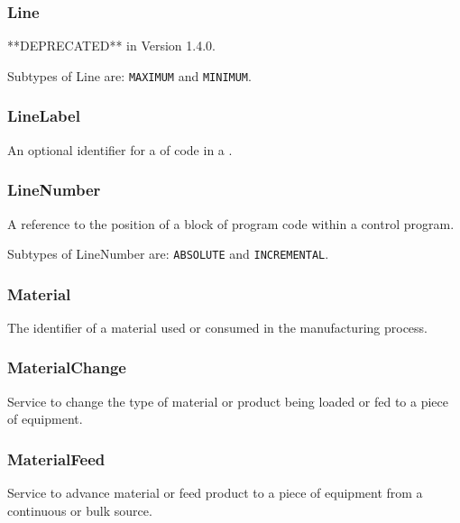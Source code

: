 \subsubsection{Line}
  \label{sec:Line}


**DEPRECATED** in Version 1.4.0.


Subtypes of Line are: \texttt{MAXIMUM} and \texttt{MINIMUM}. 
\FloatBarrier

\subsubsection{LineLabel}
  \label{sec:LineLabel}


An optional identifier for a  of code in a .

\FloatBarrier

\subsubsection{LineNumber}
  \label{sec:LineNumber}


A reference to the position of a block of program code within a control program.


Subtypes of LineNumber are: \texttt{ABSOLUTE} and \texttt{INCREMENTAL}. 
\FloatBarrier

\subsubsection{Material}
  \label{sec:Material}


The identifier of a material used or consumed in the manufacturing process.

\FloatBarrier

\subsubsection{MaterialChange}
  \label{sec:MaterialChange}


Service to change the type of material or product being loaded or fed to a piece of equipment.

\FloatBarrier

\subsubsection{MaterialFeed}
  \label{sec:MaterialFeed}


Service to advance material or feed product to a piece of equipment from a continuous or bulk source.

